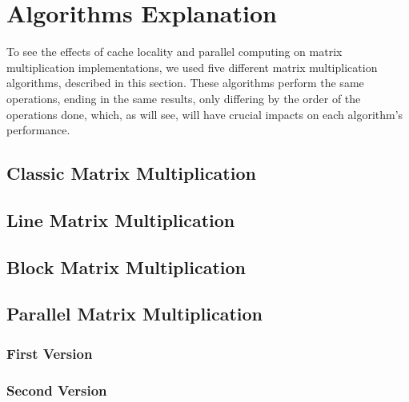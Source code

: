 \section{Algorithms Explanation} \label{section:algorithms}

To see the effects of cache locality and parallel computing on matrix multiplication implementations, we used five different matrix multiplication algorithms, described in this section. These algorithms perform the same operations, ending in the same results, only differing by the order of the operations done, which, as will see, will have crucial impacts on each algorithm's performance.

\subsection{Classic Matrix Multiplication}



\subsection{Line Matrix Multiplication}

\subsection{Block Matrix Multiplication}

\subsection{Parallel Matrix Multiplication}

\subsubsection{First Version}

\subsubsection{Second Version}

